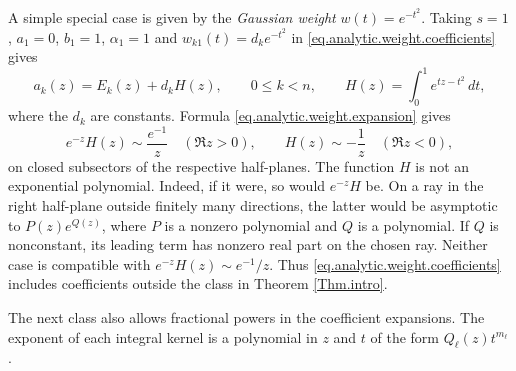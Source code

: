 \documentclass[a4paper,12pt]{article}
\numberwithin{equation}{section}
\begin{document}
A simple special case is given by the \emph{Gaussian weight}
$w(t)=e^{-t^2}$. Taking $s=1$, $a_1=0$, $b_1=1$, $\alpha_1=1$ and
$w_{k1}(t)=d_ke^{-t^2}$ in \eqref{eq.analytic.weight.coefficients} gives
\[
 a_k(z)=E_k(z)+d_kH(z),\qquad 0\le k<n,
 \qquad
 H(z)=\int_0^1 e^{tz-t^2}\,dt,
\]
where the $d_k$ are constants.
Formula \eqref{eq.analytic.weight.expansion} gives
\[
 e^{-z}H(z)\sim\frac{e^{-1}}{z}\quad(\Re z>0),
 \qquad
 H(z)\sim-\frac1z\quad(\Re z<0),
\]
on closed subsectors of the respective half-planes.
The function $H$ is not an exponential polynomial.
Indeed, if it were, so would $e^{-z}H$ be. On a ray in the right
half-plane outside finitely many directions, the latter would be
asymptotic to $P(z)e^{Q(z)}$, where $P$ is a nonzero polynomial
and $Q$ is a polynomial. If $Q$ is nonconstant, its leading term
has nonzero real part on the chosen ray. Neither case is compatible
with $e^{-z}H(z)\sim e^{-1}/z$.
Thus \eqref{eq.analytic.weight.coefficients} includes coefficients
outside the class in Theorem \ref{Thm.intro}.

The next class also allows fractional powers in the coefficient
expansions. The exponent of each integral kernel is a polynomial in
$z$ and $t$ of the form $Q_\ell(z)t^{m_\ell}$.
\end{document}
